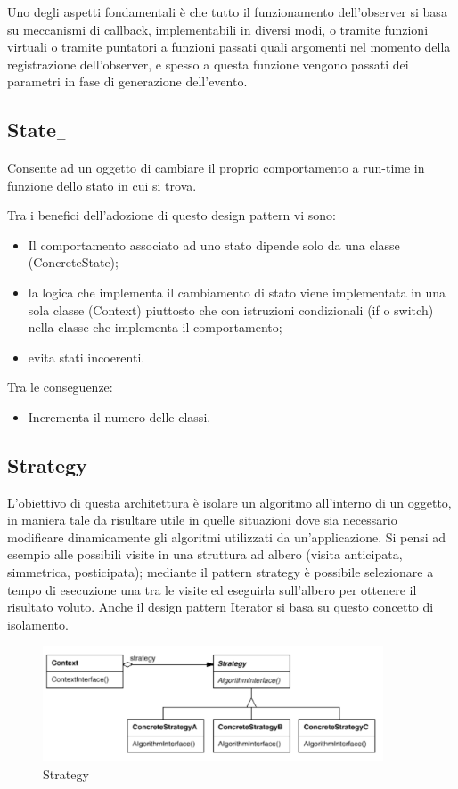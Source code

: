 Uno degli aspetti fondamentali è che tutto il funzionamento dell'observer si basa su meccanismi di callback, implementabili in diversi modi, o tramite funzioni virtuali o tramite puntatori a funzioni passati quali argomenti nel momento della registrazione dell'observer, e spesso a questa funzione vengono passati dei parametri in fase di generazione dell'evento.

\subsection{State$_+$}
Consente ad un oggetto di cambiare il proprio comportamento a run-time in funzione dello stato in cui si trova.

Tra i benefici dell'adozione di questo design pattern vi sono:
\begin{itemize}
	\item Il comportamento associato ad uno stato dipende solo da una classe (ConcreteState);
	\item la logica che implementa il cambiamento di stato viene implementata in una sola classe (Context) piuttosto che con istruzioni condizionali (if o switch) nella classe che implementa il comportamento;
	\item evita stati incoerenti.
\end{itemize}
Tra le conseguenze:
\begin{itemize}
\item Incrementa il numero delle classi.
\end{itemize}

\subsection{Strategy}
L'obiettivo di questa architettura è isolare un algoritmo all'interno di un oggetto, in maniera tale da risultare utile in quelle situazioni dove sia necessario modificare dinamicamente gli algoritmi utilizzati da un'applicazione. 
Si pensi ad esempio alle possibili visite in una struttura ad albero (visita anticipata, simmetrica, posticipata); mediante il pattern strategy è possibile selezionare a tempo di esecuzione una tra le visite ed eseguirla sull'albero per ottenere il risultato voluto.
Anche il design pattern Iterator si basa su questo concetto di isolamento.

\begin{figure}[H]
\includegraphics[width=0.9\textwidth]{res/img/DP/strategy}
\caption{Strategy}
\end{figure}

